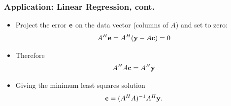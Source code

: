 \documentclass{beamer}
\begin{document}
\begin{frame}\frametitle{Application: Linear Regression, cont.}	
	\begin{itemize}
	\item Project the error $\mathbf{e}$ on the data vector (columns of $A$) and set to zero:
	\[
	A^H \mathbf{e} = A^H (\mathbf{y} - A\mathbf{c}) =0
	\]
	
	\item Therefore
	\[ A^H A \mathbf{c} = A^H \mathbf{y} \]
	
	\item Giving the minimum least squares solution
	\[ \mathbf{c} = (A^H A)^{-1} A^H \mathbf{y}. \]
	
	\end{itemize}	
\end{frame}
\end{document}
